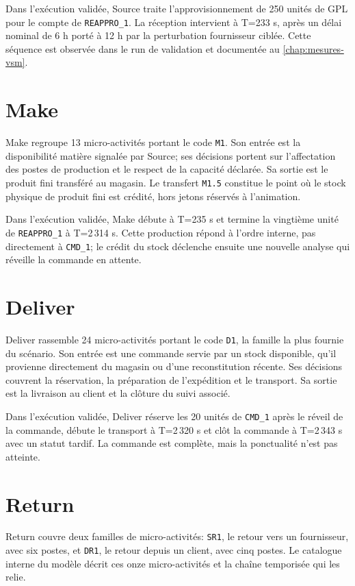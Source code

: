 Dans l'exécution validée, Source traite l'approvisionnement de 250 unités de GPL pour le compte de \texttt{REAPPRO\_1}. La réception intervient à T=233 s, après un délai nominal de 6 h porté à 12 h par la perturbation fournisseur ciblée. Cette séquence est observée dans le run de validation et documentée au \cref{chap:mesures-vsm}.

\section{Make}

Make regroupe 13 micro-activités portant le code \texttt{M1}. Son entrée est la disponibilité matière signalée par Source; ses décisions portent sur l'affectation des postes de production et le respect de la capacité déclarée. Sa sortie est le produit fini transféré au magasin. Le transfert \texttt{M1.5} constitue le point où le stock physique de produit fini est crédité, hors jetons réservés à l'animation.

Dans l'exécution validée, Make débute à T=235 s et termine la vingtième unité de \texttt{REAPPRO\_1} à T=2\,314 s. Cette production répond à l'ordre interne, pas directement à \texttt{CMD\_1}; le crédit du stock déclenche ensuite une nouvelle analyse qui réveille la commande en attente.

\section{Deliver}

Deliver rassemble 24 micro-activités portant le code \texttt{D1}, la famille la plus fournie du scénario. Son entrée est une commande servie par un stock disponible, qu'il provienne directement du magasin ou d'une reconstitution récente. Ses décisions couvrent la réservation, la préparation de l'expédition et le transport. Sa sortie est la livraison au client et la clôture du suivi associé.

Dans l'exécution validée, Deliver réserve les 20 unités de \texttt{CMD\_1} après le réveil de la commande, débute le transport à T=2\,320 s et clôt la commande à T=2\,343 s avec un statut tardif. La commande est complète, mais la ponctualité n'est pas atteinte.

\section{Return}

Return couvre deux familles de micro-activités: \texttt{SR1}, le retour vers un fournisseur, avec six postes, et \texttt{DR1}, le retour depuis un client, avec cinq postes. Le catalogue interne du modèle décrit ces onze micro-activités et la chaîne temporisée qui les relie.

